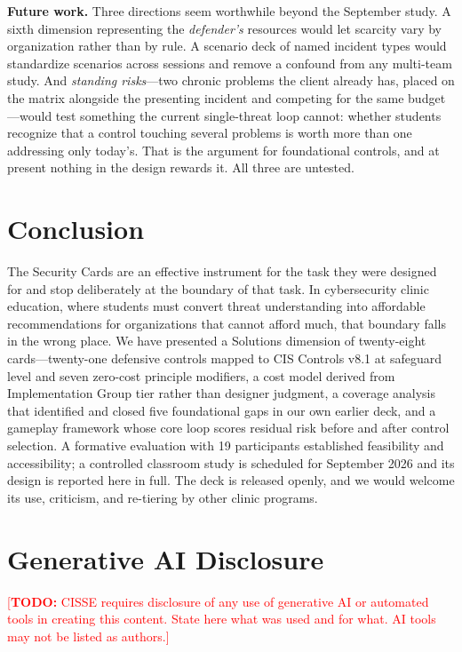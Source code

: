 \documentclass[10pt,twocolumn,letterpaper]{article}
\newcommand{\todo}[1]{\textcolor{red}{[\textbf{TODO:} #1]}}
\begin{document}
\textbf{Future work.} Three directions seem worthwhile beyond the September study. A sixth dimension representing
the \emph{defender's} resources would let scarcity vary by organization rather
than by rule. A scenario deck of named incident types would standardize scenarios
across sessions and remove a confound from any multi-team study. And
\emph{standing risks}---two chronic problems the client already has, placed on
the matrix alongside the presenting incident and competing for the same
budget---would test something the current single-threat loop cannot: whether
students recognize that a control touching several problems is worth more than
one addressing only today's. That is the argument for foundational controls, and
at present nothing in the design rewards it. All three are untested.

\section{Conclusion}

The Security Cards are an effective instrument for the task they were designed
for and stop deliberately at the boundary of that task. In cybersecurity clinic
education, where students must convert threat understanding into affordable
recommendations for organizations that cannot afford much, that boundary falls
in the wrong place. We have presented a Solutions dimension of twenty-eight
cards---twenty-one defensive controls mapped to CIS Controls v8.1 at safeguard
level and seven zero-cost principle modifiers, a cost model derived from
Implementation Group tier rather than designer judgment, a coverage analysis
that identified and closed five foundational gaps in our own earlier deck, and
a gameplay framework whose core loop scores residual risk before and after
control selection. A formative evaluation with 19 participants established
feasibility and accessibility; a controlled classroom study is scheduled for
September 2026 and its design is reported here in full. The deck is released
openly, and we would welcome its use, criticism, and re-tiering by other clinic
programs.

\section*{Generative AI Disclosure}
\todo{CISSE requires disclosure of any use of generative AI or automated tools
in creating this content. State here what was used and for what. AI tools may
not be listed as authors.}
\end{document}
